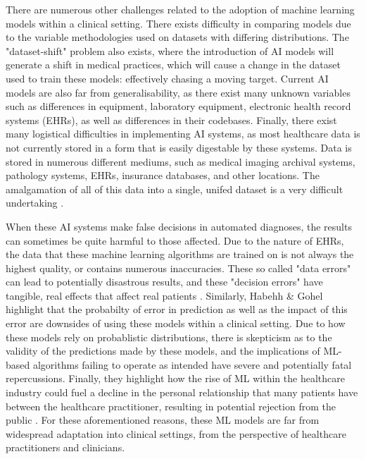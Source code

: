 \documentclass[12pt]{article}
\begin{document}
There are numerous other challenges related to the adoption of machine learning models within a clinical setting. There exists difficulty in comparing models due to the variable methodologies used on datasets with differing distributions. The "dataset-shift" problem also exists, where the introduction of AI models will generate a shift in medical practices, which will cause a change in the dataset used to train these models: effectively chasing a moving target. Current AI models are also far from generalisability, as there exist many unknown variables such as differences in equipment, laboratory equipment, electronic health record systems (EHRs), as well as differences in their codebases. Finally, there exist many logistical difficulties in implementing AI systems, as most healthcare data is not currently stored in a form that is easily digestable by these systems. Data is stored in numerous different mediums, such as medical imaging archival systems, pathology systems, EHRs, insurance databases, and other locations. The amalgamation of all of this data into a single, unifed dataset is a very difficult undertaking \cite{Kelly_2019}. \

When these AI systems make false decisions in automated diagnoses, the results can sometimes be quite harmful to those affected. Due to the nature of EHRs, the data that these machine learning algorithms are trained on is not always the highest quality, or contains numerous inaccuracies. These so called "data errors" can lead to potentially disastrous results, and these "decision errors" have tangible, real effects that affect real patients \cite{Ali_2023}. Similarly, Habehh \& Gohel highlight that the probabilty of error in prediction as well as the impact of this error are downsides of using these models within a clinical setting. Due to how these models rely on probablistic distributions, there is skepticism as to the validity of the predictions made by these models, and the implications of ML-based algorithms failing to operate as intended have severe and potentially fatal repercussions. Finally, they highlight how the rise of ML within the healthcare industry could fuel a decline in the personal relationship that many patients have between the healthcare practitioner, resulting in potential rejection from the public \cite{Habehh_2021}. For these aforementioned reasons, these ML models are far from widespread adaptation into clinical settings, from the perspective of healthcare practitioners and clinicians. \

\vspace{-5mm}
\end{document}
